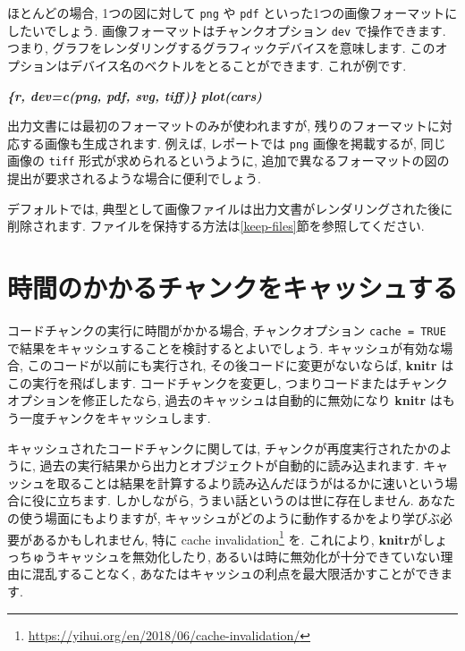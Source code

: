 \documentclass[
  11pt,
]{bxjsreport}
\newenvironment{Shaded}{\begin{snugshade}}{\end{snugshade}}
\newcommand{\InformationTok}[1]{\textcolor[rgb]{0.56,0.35,0.01}{\textbf{\textit{#1}}}}
\renewcommand{\href}[2]{#2\footnote{\url{#1}}}
\begin{document}
ほとんどの場合, 1つの図に対して \texttt{png} や \texttt{pdf} といった1つの画像フォーマットにしたいでしょう. 画像フォーマットはチャンクオプション \texttt{dev} で操作できます. つまり, グラフをレンダリングするグラフィックデバイスを意味します. このオプションはデバイス名のベクトルをとることができます. これが例です.

\begin{Shaded}
\begin{Highlighting}[]
\InformationTok{\textasciigrave{}\textasciigrave{}\textasciigrave{}\{r, dev=c(\textquotesingle{}png\textquotesingle{}, \textquotesingle{}pdf\textquotesingle{}, \textquotesingle{}svg\textquotesingle{}, \textquotesingle{}tiff\textquotesingle{})\}}
\InformationTok{plot(cars)}
\InformationTok{\textasciigrave{}\textasciigrave{}\textasciigrave{}}
\end{Highlighting}
\end{Shaded}

出力文書には最初のフォーマットのみが使われますが, 残りのフォーマットに対応する画像も生成されます. 例えば, レポートでは \texttt{png} 画像を掲載するが, 同じ画像の \texttt{tiff} 形式が求められるというように, 追加で異なるフォーマットの図の提出が要求されるような場合に便利でしょう.

デフォルトでは, 典型として画像ファイルは出力文書がレンダリングされた後に削除されます. ファイルを保持する方法は\ref{keep-files}節を参照してください.

\hypertarget{cache}{%
\section{時間のかかるチャンクをキャッシュする}\label{cache}}

コードチャンクの実行に時間がかかる場合, チャンクオプション \texttt{cache = TRUE} で結果をキャッシュすることを検討するとよいでしょう. キャッシュが有効な場合, このコードが以前にも実行され, その後コードに変更がないならば, \textbf{knitr} はこの実行を飛ばします. コードチャンクを変更し, つまりコードまたはチャンクオプションを修正したなら, 過去のキャッシュは自動的に無効になり \textbf{knitr} はもう一度チャンクをキャッシュします.

キャッシュされたコードチャンクに関しては, チャンクが再度実行されたかのように, 過去の実行結果から出力とオブジェクトが自動的に読み込まれます. キャッシュを取ることは結果を計算するより読み込んだほうがはるかに速いという場合に役に立ちます. しかしながら, うまい話というのは世に存在しません. あなたの使う場面にもよりますが, キャッシュがどのように動作するかをより学びぶ必要があるかもしれません, 特に \href{https://yihui.org/en/2018/06/cache-invalidation/}{cache invalidation} を. これにより, \textbf{knitr}がしょっちゅうキャッシュを無効化したり, あるいは時に無効化が十分できていない理由に混乱することなく, あなたはキャッシュの利点を最大限活かすことができます.
\end{document}
